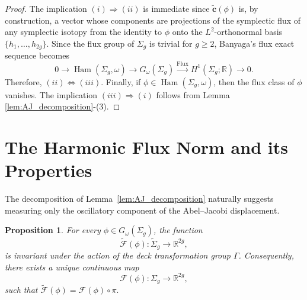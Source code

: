 \documentclass[11pt]{article}
\newtheorem{proposition}[theorem]{Proposition}
\theoremstyle{definition}
\newcommand{\Ham}{\operatorname{Ham}}
\begin{document}
	\begin{proof}
		The implication $(i)\Longrightarrow(ii)$ is immediate since $\widetilde{\mathbf
			c}(\phi)$ is, by construction, a vector whose components are projections of the
		symplectic flux of any symplectic isotopy from the identity to $\phi$ onto the
		$L^2$-orthonormal basis $\{h_1,\dots,h_{2g}\}$. Since the flux group of
		$\Sigma_g$ is trivial for $g\ge2$, Banyaga's flux exact sequence becomes
		\[
		0
		\longrightarrow
		\Ham(\Sigma_g,\omega)
		\longrightarrow
		G_\omega(\Sigma_g)
		\xrightarrow{\operatorname{Flux}}
		H^1(\Sigma_g;\mathbb R)
		\longrightarrow
		0.
		\]
		Therefore, $(ii)\Longleftrightarrow(iii).$ Finally, if $\phi\in\Ham(\Sigma_g,\omega)$,
		then the flux class of $\phi$ vanishes. The implication $(iii)\Longrightarrow(i)$
		follows from Lemma \ref{lem:AJ_decomposition}-(3).
	\end{proof}
	
	\section{The Harmonic Flux Norm and its Properties}
	
	The decomposition of Lemma~\ref{lem:AJ_decomposition} naturally suggests
	measuring only the oscillatory component of the Abel--Jacobi displacement.
	
	\begin{proposition}\label{DECK}
		For every $\phi\in G_\omega(\Sigma_g)$, the function
		\[
		\widetilde{\mathcal F}(\phi): \widetilde{\Sigma}_g\longrightarrow\mathbb R^{2g},
		\]
		is invariant under the action of the deck transformation group $\Gamma$.
		Consequently, there exists a unique continuous map
		\[
		\mathcal F(\phi):\Sigma_g\longrightarrow\mathbb R^{2g},
		\]
		such that $\widetilde{\mathcal F}(\phi) = \mathcal F(\phi)\circ\pi.$ 
	\end{proposition}
	
\end{document}
